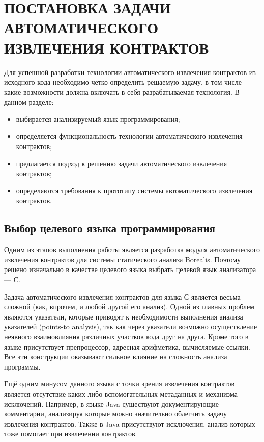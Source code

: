 \chapter{ПОСТАНОВКА ЗАДАЧИ АВТОМАТИЧЕСКОГО ИЗВЛЕЧЕНИЯ КОНТРАКТОВ}
\label{chapter:task}
Для успешной разработки технологии автоматического извлечения контрактов из исходного кода необходимо четко определить решаемую задачу, в том числе какие возможности должна включать в себя разрабатываемая технология. В данном разделе:
\begin{itemize}
\item выбирается анализируемый язык программирования;
\item определяется функциональность технологии автоматического извлечения контрактов;
\item предлагается подход к решению задачи автоматического извлечения контрактов;
\item определяются требования к прототипу системы автоматического извлечения контрактов.
\end{itemize}

\section{Выбор целевого языка программирования}
Одним из этапов выполнения работы является разработка модуля автоматического извлечения контрактов для системы статического анализа Borealis\cite{borealis}. Поэтому решено изначально в качестве целевого языка выбрать целевой язык анализатора --- С\cite{languageC}.

Задача автоматического извлечения контрактов для языка С является весьма сложной (как, впрочем, и любой другой его анализ). Одной из главных проблем являются указатели, которые приводят к необходимости выполнения анализа указателей (points-to analysis), так как через указатели возможно осуществление неявного взаимовлияния различных участков кода друг на друга. Кроме того в языке присутствует препроцессор, адресная арифметика, вычисляемые ссылки. Все эти конструкции оказывают сильное влияние на сложность анализа программы.

Ещё одним минусом данного языка с точки зрения извлечения контрактов является отсутствие каких-либо вспомогательных метаданных и механизма исключений. Например, в языке Java\cite{languageJava} существуют документирующие комментарии, анализируя которые можно значительно облегчить задачу извлечения контрактов. Также в Java присутствуют исключения, анализ которых тоже помогает при извлечении контрактов.

